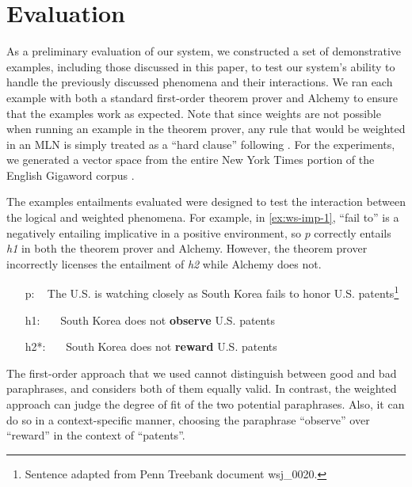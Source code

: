 \section{Evaluation}

As a preliminary evaluation of our system, we constructed a set of demonstrative
examples, including those discussed in this paper, to test our system's ability
to handle the previously discussed phenomena and their interactions.  We ran
each example with both a standard first-order theorem prover and Alchemy to
ensure that the examples work as expected. Note that since weights are not
possible when running an example in the theorem prover, any rule that would be
weighted in an MLN is simply treated as a ``hard clause'' following
\citet{bos:emnlp2005}.  For the experiments, we generated a vector space from
the entire New York Times portion of the English Gigaword corpus
\citep{graff:gigaword2003}.

The examples entailments evaluated were designed to test the interaction between
the logical and weighted phenomena.  For example, in \eqref{ex:ws-imp-1}, ``fail
to'' is a negatively entailing implicative in a positive environment, so $p$
correctly entails {\it h1} in both the theorem prover and Alchemy.
However, the theorem prover incorrectly licenses the entailment of {\it h2}
while Alchemy does not.
\begin{covex}\label{ex:ws-imp-1}
\begin{itemize}
  \item[p:]~    The U.S. is watching closely as South Korea fails to honor
  U.S. patents\footnote{Sentence adapted from Penn Treebank document wsj\_0020.}
  \item[h1:]~~~South Korea does not {\bf observe} U.S. patents
  \item[h2*:]~~~South Korea does not {\bf reward} U.S. patents
\end{itemize}
\end{covex}
The first-order approach that we used cannot distinguish between
good and bad paraphrases, and considers both of them equally valid. In
contrast, the weighted approach can judge the degree of fit of the two potential
paraphrases. Also, it can do so in a context-specific manner, choosing
the paraphrase ``observe'' over ``reward'' in the context of
``patents''. 

